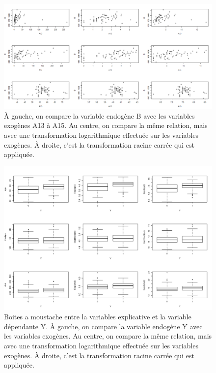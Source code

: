 \documentclass{article}
\begin{document}
	\begin{figure}[H]
		\includegraphics[width=\textwidth]{graphiques/Qst1_transformations_5}
		\caption{À gauche, on compare la variable endogène B avec les variables exogènes A13 à A15. Au centre, on compare la même relation, mais avec une transformation logarithmique effectuée sur les variables exogènes. À droite, c'est la transformation racine carrée qui est appliquée.}
		\label{Qst1_transformations_5}
	\end{figure}

	\begin{figure}[H]
		\includegraphics[width=\textwidth]{graphiques/Q2_transformation_1}
		\caption{Boites a moustache entre la variables explicative et la variable dépendante Y.
		À gauche, on compare la variable endogène Y avec les variables exogènes. Au centre, on compare la même relation, mais avec une transformation logarithmique effectuée sur les variables exogènes. À droite, c'est la transformation racine carrée qui est appliquée.}
		\label{Q2_transformations_1}
	\end{figure}
\end{document}

